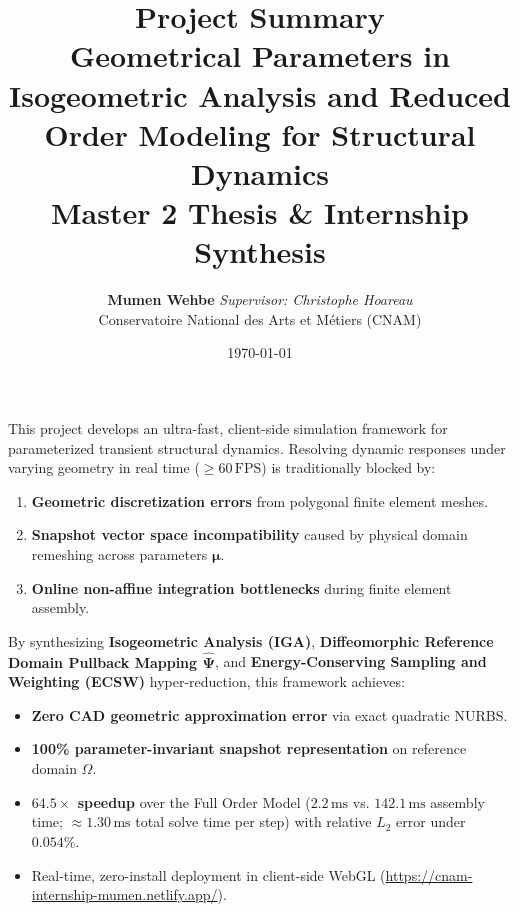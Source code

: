 \documentclass[11pt,a4paper]{article}
\title{
    \vspace{-1.0cm}
    \textbf{\huge Project Summary} \\[0.4em]
    \textbf{\Large Geometrical Parameters in Isogeometric Analysis and Reduced Order Modeling for Structural Dynamics} \\[0.2em]
    \large Master 2 Thesis \& Internship Synthesis
}
\author{
    \textbf{Mumen Wehbe} \quad \textit{Supervisor: Christophe Hoareau} \\
    \small Conservatoire National des Arts et Métiers (CNAM)
}
\date{\today}
\begin{document}
\maketitle

\begin{tcolorbox}[colback=lightbg, colframe=primaryblue, title=\textbf{Executive Summary \& Core Breakthrough}, fonttitle=\bfseries]
This project develops an ultra-fast, client-side simulation framework for parameterized transient structural dynamics. Resolving dynamic responses under varying geometry in real time ($\ge 60\,\text{FPS}$) is traditionally blocked by:
\begin{enumerate}[noitemsep, leftmargin=*]
    \item \textbf{Geometric discretization errors} from polygonal finite element meshes.
    \item \textbf{Snapshot vector space incompatibility} caused by physical domain remeshing across parameters $\boldsymbol{\mu}$.
    \item \textbf{Online non-affine integration bottlenecks} during finite element assembly.
\end{enumerate}
By synthesizing \textbf{Isogeometric Analysis (IGA)}, \textbf{Diffeomorphic Reference Domain Pullback Mapping $\hat{\boldsymbol{\Psi}}$}, and \textbf{Energy-Conserving Sampling and Weighting (ECSW)} hyper-reduction, this framework achieves:
\begin{itemize}[noitemsep, leftmargin=*]
    \item \textbf{Zero CAD geometric approximation error} via exact quadratic NURBS.
    \item \textbf{100\% parameter-invariant snapshot representation} on reference domain $\hat{\Omega}$.
    \item \textbf{$\mathbf{64.5\times}$ speedup} over the Full Order Model ($2.2\,\text{ms}$ vs. $142.1\,\text{ms}$ assembly time; $\approx 1.30\,\text{ms}$ total solve time per step) with relative $L_2$ error under $\mathbf{0.054\%}$.
    \item Real-time, zero-install deployment in client-side WebGL (\url{https://cnam-internship-mumen.netlify.app/}).
\end{itemize}
\end{tcolorbox}

\end{document}
